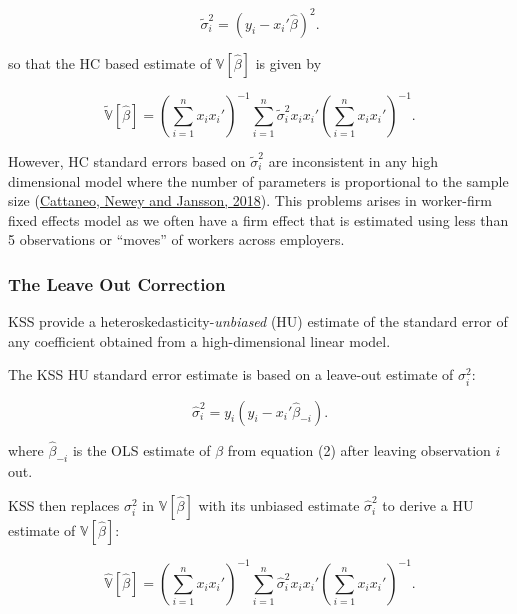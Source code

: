 \documentclass[11pt]{article}
\begin{document}
\begin{equation}
\tilde{\sigma}^{2}_{i}=(y_{i}-x_{i}'\hat{\beta})^2.
\end{equation}

so that the HC based estimate of \(\mathbb{V}[\hat{\beta}]\) is given by

\begin{equation}
\tilde{\mathbb{{V}}}[\hat{\beta}]=\left(\sum_{i=1}^{n}x_{i}x_{i}'\right)^{-1}\sum_{i=1}^{n}\tilde{{\sigma}}^{2}_{i}x_{i}x_{i}'\left(\sum_{i=1}^{n}x_{i}x_{i}'\right)^{-1}.
\end{equation}

However, HC standard errors based on \(\tilde{\sigma}^{2}_{i}\) are
inconsistent in any high dimensional model where the number of
parameters is proportional to the sample size (\href{Cattaneo, Newey and Jansson (2018)}{Cattaneo, Newey and Jansson, 2018}). This problems arises in worker-firm fixed effects model  as we often have a firm effect that is estimated using less than
5 observations or ``moves'' of workers across employers.

\hypertarget{the-leave-out-correction}{%
\subsubsection{The Leave Out
Correction}\label{the-leave-out-correction}}

KSS provide a heteroskedasticity-\emph{unbiased} (HU) estimate of the
standard error of any coefficient obtained from a high-dimensional
linear model.

The KSS HU standard error estimate is based on a leave-out estimate of
\(\sigma^{2}_{i}\):

\begin{equation}
\hat{\sigma}^{2}_{i}=y_{i}(y_{i}-x_{i}'\hat{\beta}_{-i}).
\end{equation}

where \(\hat{\beta}_{-i}\) is the OLS estimate of \(\beta\) from
equation (2) after leaving observation \(i\) out.

KSS then replaces \(\sigma^{2}_{i}\) in \(\mathbb{V}[\hat{\beta}]\) with
its unbiased estimate \(\hat{\sigma}^{2}_{i}\) to derive a HU estimate
of \(\mathbb{V}[\hat{\beta}]:\)

\begin{equation}
\hat{\mathbb{{V}}}[\hat{\beta}]=\left(\sum_{i=1}^{n}x_{i}x_{i}'\right)^{-1}\sum_{i=1}^{n}\hat{{\sigma}}^{2}_{i}x_{i}x_{i}'\left(\sum_{i=1}^{n}x_{i}x_{i}'\right)^{-1}.
\end{equation}
\end{document}

